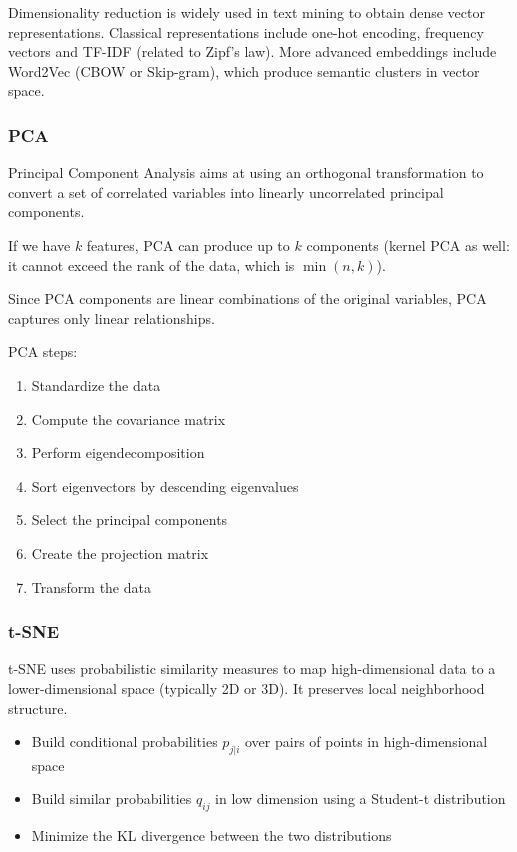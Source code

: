 \vspace{10pt}

Dimensionality reduction is widely used in text mining to obtain dense vector representations. Classical representations include one-hot encoding, frequency vectors and TF-IDF (related to Zipf's law). More advanced embeddings include Word2Vec (CBOW or Skip-gram), which produce semantic clusters in vector space.

\subsubsection{PCA}

Principal Component Analysis aims at using an orthogonal transformation to convert a set of correlated variables into linearly uncorrelated principal components.  

If we have \(k\) features, PCA can produce up to \(k\) components (kernel PCA as well: it cannot exceed the rank of the data, which is \(\min(n, k)\)).  

Since PCA components are linear combinations of the original variables, PCA captures only linear relationships.

\vspace{10pt}

PCA steps:

\begin{enumerate}
    \item Standardize the data
    \item Compute the covariance matrix
    \item Perform eigendecomposition
    \item Sort eigenvectors by descending eigenvalues
    \item Select the principal components
    \item Create the projection matrix
    \item Transform the data
\end{enumerate}

\subsubsection{t-SNE}

t-SNE uses probabilistic similarity measures to map high-dimensional data to a lower-dimensional space (typically 2D or 3D). It preserves local neighborhood structure.  

\begin{itemize}
    \item Build conditional probabilities \(p_{j|i}\) over pairs of points in high-dimensional space  
    \item Build similar probabilities \(q_{ij}\) in low dimension using a Student-t distribution  
    \item Minimize the KL divergence between the two distributions  
\end{itemize}

